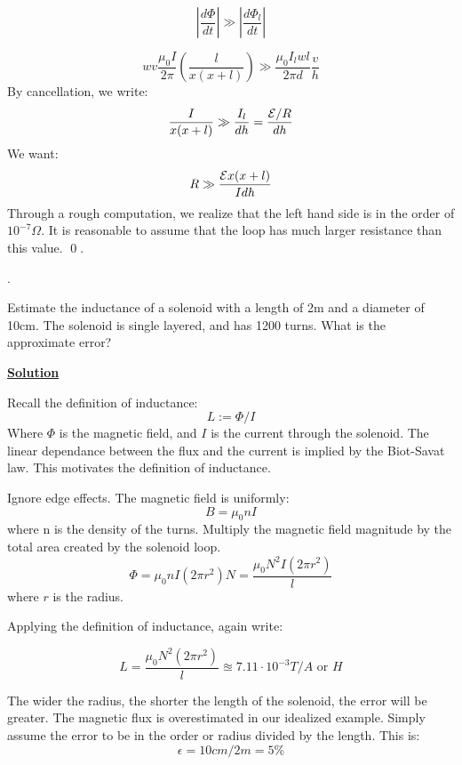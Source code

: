 \documentclass{article}
\newcommand{\new}[1]{
    \vspace{2mm}
    \noindent
    \textbf{
    \underline{#1}}
}
\newcounter{problemcnt}
\newcommand{\Problem}{{
    \vspace{5mm}
    \stepcounter{problemcnt}
    \noindent
    \arabic{problemcnt}. 
}
}
\begin{document}
\[
    |\frac{d\Phi}{dt}| \gg |\frac{d\Phi_l}{dt}|
\]

\[
    wv
    \frac{\mu_0 I}{2\pi}
    \left(
        \frac{l}{x(x+l)}
    \right)
    \gg
   \frac{\mu_0 I_l w l}{2\pi d} \frac {v}{h}
\]
By cancellation, we write:
\[
    \frac{I}{x(x+l)} \gg \frac{I_l}{dh} = \frac{{\mathcal{E}} / R}{dh}
\]
We want:
\[
    R \gg \frac{{\mathcal{E}} x (x+l)}{Idh}
\]
Through a rough computation, we realize that the left hand 
side is in the order of $10^{-7}\Omega$. It is reasonable 
to assume that the loop has much larger resistance than 
this value. \qed.  

\Problem

Estimate the inductance of a solenoid with a length of 
2m and a diameter of 10cm. The solenoid is single layered, and 
has 1200 turns. What is the approximate error?

\new{Solution}

Recall the definition of inductance:
\[
    L := \Phi / I
\]
Where $\Phi$ is the magnetic field, and $I$ is the current 
through the solenoid. The linear dependance between the flux 
and the current is implied by the Biot-Savat law. This motivates 
the definition of inductance. 

Ignore edge effects. The magnetic field is uniformly:
\[
    B = \mu_0 n I
\]
where n is the density of the turns. Multiply the magnetic 
field magnitude by the total area created by the solenoid loop. 
\[
    \Phi = \mu_0 n I (2\pi r^2) N = 
    \frac{\mu_0 N^2 I (2\pi r^2)}{l}
\]
where $r$ is the radius. 

Applying the definition of inductance, again write:

\[
    \boxed{
    L =    \frac{\mu_0 N^2 (2\pi r^2)}{l}
    \approxeq 7.11\cdot 10^{-3}T/A \textrm{ or } H
    }
\]

The wider the radius, the shorter the length of the solenoid, 
the error will be greater. The magnetic flux is overestimated 
in our idealized example. Simply assume the error to be in the order 
or radius divided by the length. This is:
\[
    \epsilon = 10cm/2m = 5\%
\]
\end{document}
